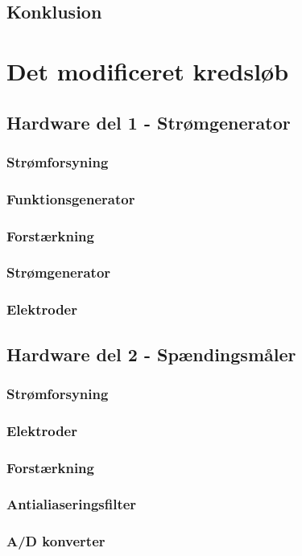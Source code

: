 \section{Konklusion}

\chapter{Det modificeret kredsløb}
\section{Hardware del 1 - Strømgenerator}
\subsection{Strømforsyning}
\subsection{Funktionsgenerator}
\subsection{Forstærkning}
\subsection{Strømgenerator}
\subsection{Elektroder}
\section{Hardware del 2 - Spændingsmåler}
\subsection{Strømforsyning}
\subsection{Elektroder}
\subsection{Forstærkning}
\subsection{Antialiaseringsfilter}
\subsection{A/D konverter}


